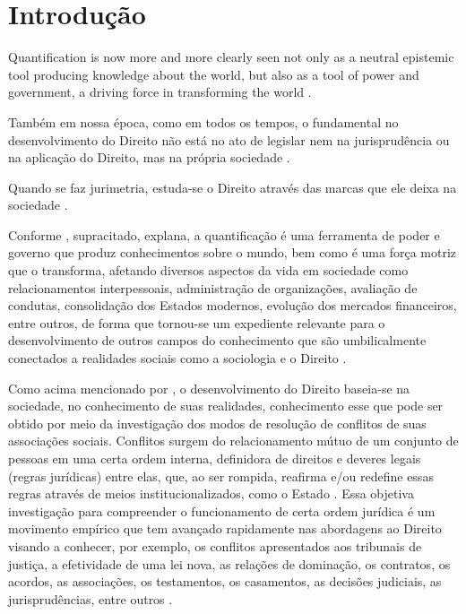 
\chapter{Introdução}
\label{chap_introducao}

\begin{citacao}
Quantification is now more and more clearly seen not only as a neutral epistemic tool producing knowledge about the world, but also as a tool of power and government, a driving force in transforming the world \cite{didier2022}.
\end{citacao}
\begin{citacao}
Também em nossa época, como em todos os tempos, o fundamental no desenvolvimento do Direito não está no ato de legislar nem na jurisprudência ou na aplicação do Direito, mas na própria sociedade \cite{ehrlich1967fundamentos}. 
\end{citacao}
\begin{citacao}
Quando se faz jurimetria, estuda-se o Direito através das marcas que ele deixa na sociedade \cite{abj2022}.
\end{citacao}

Conforme , supracitado, explana, a quantificação é uma ferramenta de poder e governo que produz conhecimentos sobre o mundo, bem como é uma força motriz que o transforma, afetando diversos aspectos da vida em sociedade como relacionamentos interpessoais, administração de organizações, avaliação de condutas, consolidação dos Estados modernos, evolução dos mercados financeiros, entre outros, de forma que tornou-se um expediente relevante para o desenvolvimento de outros campos do conhecimento que são umbilicalmente conectados a realidades sociais como a sociologia e o Direito \cite{camargo2021estudos}.

Como acima mencionado por , o desenvolvimento do Direito baseia-se na sociedade, no conhecimento de suas realidades, conhecimento esse que pode ser obtido por meio da investigação dos modos de resolução de conflitos de suas associações sociais. Conflitos surgem do relacionamento mútuo de um conjunto de pessoas em uma certa ordem interna, definidora de direitos e deveres legais (regras jurídicas) entre elas, que, ao ser rompida, reafirma e/ou redefine essas regras através de meios institucionalizados, como o Estado \cite{ehrlich1967fundamentos}. Essa objetiva investigação para compreender o funcionamento de certa ordem jurídica é um movimento empírico que tem avançado rapidamente nas abordagens ao Direito visando a conhecer, por exemplo, os conflitos apresentados aos tribunais de justiça, a efetividade de uma lei nova, as relações de dominação, os contratos, os acordos, as associações, os testamentos, os casamentos, as decisões judiciais, as jurisprudências, entre outros \cite{ehrlich1967fundamentos} \cite{nunes2016jurimetria}.

